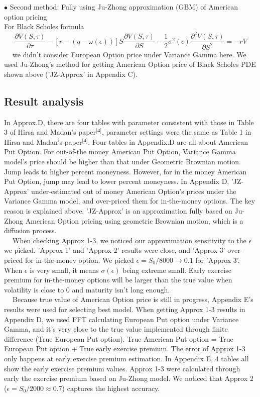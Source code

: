 \documentclass[preprint,12pt,1p]{elsarticle}
\begin{document}
\begin{spacing}{1.5}
$\bullet$ Second method: Fully using Ju-Zhong approximation (GBM) of American option pricing\\
For Black Scholes formula $$\frac{\partial V(S,\tau)}{\partial \tau} - [r-(q-\omega(\epsilon))]S\frac{\partial V(S,\tau)}{\partial S} - \frac{1}{2} \sigma^2(\epsilon)\frac{\partial^2 V(S,\tau)}{\partial S^2}  = -rV$$
$~~~~$ we didn't consider European Option price under Variance Gamma here. We used Ju-Zhong's method for getting American Option price of Black Scholes PDE shown above ('JZ-Approx' in Appendix C).\\


\subsection{Result analysis}
\label{subsec2}
In Approx.D, there are four tables with parameter consistent with those in Table 3 of Hirsa and Madan's paper$^{\textbf{[4]}}$, parameter settings were the same as Table 1 in Hirsa and Madan's paper$^{\textbf{[4]}}$. Four tables in Appendix.D are all about American Put Option. For out-of-the money American Put Option, Variance Gamma model's price should be higher than that under Geometric Brownian motion. Jump leads to higher percent moneyness. However, for in the money American Put Option, jump may lead to lower percent moneyness. In Appendix D, 'JZ-Approx' under-estimated out of money American Option's prices under the Variance Gamma model, and over-priced them for in-the-money options. The key reason is explained above. 'JZ-Approx' is an approximation fully based on Ju-Zhong American Option pricing using geometric Brownian motion, which is a diffusion process. \\
$~~~~$ When checking Approx 1-3, we noticed our approximation sensitivity to the $\epsilon$ we picked. 'Approx 1' and 'Approx 2' results were close, and 'Approx 3' over-priced for in-the-money option. We picked $\epsilon = S_0/8000 \rightarrow 0.1$ for 'Approx 3'. When $\epsilon$ is very small, it means $\sigma(\epsilon)$  being extreme small. Early exercise premium for in-the-money options will be larger than the true value when volatility is close to 0 and maturity isn't long enough.\\
$~~~~$ Because true value of American Option price is still in progress, Appendix E's results were used for selecting best model. When getting Approx 1-3 results in Appendix D, we used FFT calculating European Put option under Variance Gamma, and it's very close to the true value implemented through finite difference (True European Put option). True American Put option = True European Put option + True early exercise premium.  The error of Approx 1-3 only happens at early exercise premium estimation. In Appendix E, 4 tables all show the early exercise premium values. Approx 1-3 were calculated through early the exercise premium based on Ju-Zhong model. We noticed that Approx 2 ($\epsilon = S_0 / 2000 \approx 0.7$) captures the highest accuracy. 


\end{spacing}
\end{document}
